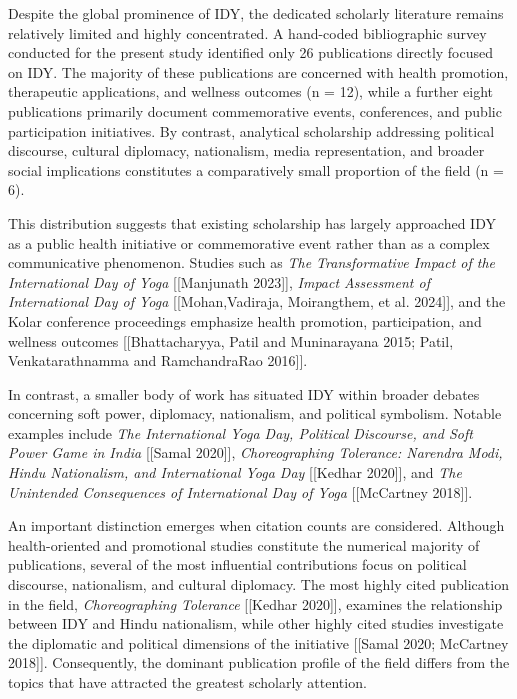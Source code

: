 \documentclass[11pt]{article}
\begin{document}
Despite the global prominence of IDY, the dedicated scholarly literature remains relatively limited and highly
concentrated. A hand-coded bibliographic survey conducted for the present study identified only 26 publications directly
focused on IDY. The majority of these publications are concerned with health promotion, therapeutic applications, and
wellness outcomes (n = 12), while a further eight publications primarily document commemorative events, conferences, and
public participation initiatives. By contrast, analytical scholarship addressing political discourse, cultural
diplomacy, nationalism, media representation, and broader social implications constitutes a comparatively small
proportion of the field (n = 6).

This distribution suggests that existing scholarship has largely approached IDY as a public health initiative or
commemorative event rather than as a complex communicative phenomenon. Studies such as \textit{The Transformative Impact
of the International Day of Yoga} [[Manjunath 2023]], \textit{Impact Assessment of International Day of Yoga}
[[Mohan,Vadiraja, Moirangthem, et al. 2024]], and the Kolar conference proceedings emphasize health promotion,
participation, and wellness outcomes [[Bhattacharyya, Patil and Muninarayana 2015; Patil, Venkatarathnamma and RamchandraRao 2016]]. 

In contrast, a smaller body of work has situated IDY within broader debates
concerning soft power, diplomacy, nationalism, and political symbolism. Notable examples include \textit{The
International Yoga Day, Political Discourse, and Soft Power Game in India} [[Samal 2020]], \textit{Choreographing
Tolerance: Narendra Modi, Hindu Nationalism, and International Yoga Day} [[Kedhar 2020]], and \textit{The
Unintended Consequences of International Day of Yoga} [[McCartney 2018]].

An important distinction emerges when citation counts are considered. Although health-oriented and promotional studies
constitute the numerical majority of publications, several of the most influential contributions focus on political
discourse, nationalism, and cultural diplomacy. The most highly cited publication in the field, \textit{Choreographing
Tolerance} [[Kedhar 2020]], examines the relationship between IDY and Hindu nationalism, while other highly
cited studies investigate the diplomatic and political dimensions of the initiative [[Samal 2020; McCartney 2018]]. 
Consequently, the dominant publication profile of the field differs from the topics that have attracted
the greatest scholarly attention.
\end{document}
